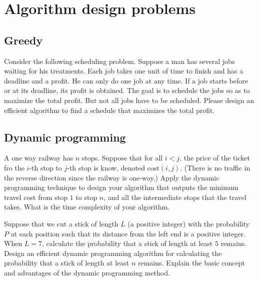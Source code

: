 \chapter{Algorithm design problems}
\begin{refsection}

\section{Greedy}
\begin{Exercise}
Consider the following scheduling problem. Suppose a man has several jobs waiting for his treatments. Each job takes one unit of time to finish and has a deadline and a profit. He can only do one job at any time. If a job starts before or at its deadline, its profit is obtained. The goal is to schedule the jobs so as to maximize the total profit. But not all jobs have to be scheduled. Please design an efficient algorithm to find a schedule that maximizes the total profit. 
\end{Exercise}
\begin{Answer}
\end{Answer}


\section{Dynamic programming}
\begin{Exercise}
A one way railway has $n$ stops. Suppose that for all $i < j$, the price of the ticket fro the $i$-th stop to $j$-th stop is know, denoted $\text{cost}(i, j)$. (There is no traffic in the reverse direction since the railway is one-way.) Apply the dynamic programming technique to design your algorithm that outputs the minimum travel cost from stop $1$ to stop $n$, and all the intermediate stops that the travel takes. What is the time complexity of your algorithm. 
\end{Exercise}
\begin{Answer}
\end{Answer}

\begin{Exercise}
Suppose that we cut a stick of length $L$ (a positive integer) with the probability $P$ at each position such that its distance from the left end is a positive integer.
When $L = 7$, calculate the probability that a stick of length at least $5$ remains.
Design an efficient dynamic programming algorithm for calculating the probability that a stick of length at least $n$ remains.
Explain the basic concept and advantages of the dynamic programming method. 
\end{Exercise}
\begin{Answer}
\end{Answer}


\end{refsection}
